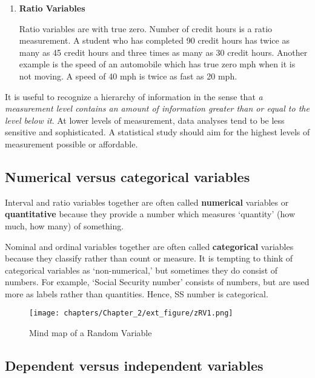 \documentclass[11pt]{book}\usepackage[]{graphicx}\usepackage[]{color}
\begin{document}
\begin{enumerate}
\item \textbf{Ratio Variables}

Ratio variables are  with true zero.  Number of credit hours is a ratio measurement.  A student who has completed 90 credit hours has twice as many as 45 credit hours and three times as many as 30 credit hours.  Another example is the speed of an automobile which has true zero mph when it is not moving.  A speed of 40 mph is twice as fast as 20 mph.
\end{enumerate}

It is useful to recognize a hierarchy of information in the sense that \textit{a measurement level contains an amount of information greater than or equal to the level below it}.  At lower levels of measurement, data analyses tend to be less sensitive and sophisticated.  A statistical study should aim for the highest levels of measurement possible or affordable.

\subsection{Numerical versus categorical variables}

Interval and ratio variables together are often called \textbf{numerical} variables or \textbf{quantitative} because they provide a number which measures `quantity' (how much, how many) of something.

Nominal and ordinal variables together are often called \textbf{categorical} variables because they classify rather than count or measure.  It is tempting to think of categorical variables as `non-numerical,' but sometimes they do consist of numbers.  For example, `Social Security number' consists of numbers, but are used more as labels rather than quantities.  Hence, SS number is categorical.

\begin{figure}[htbp]
   \centering

   \caption{Mind map of a Random Variable}

   \texttt{[image: chapters/Chapter\_2/ext\_figure/zRV1.png]} %

\end{figure}


\subsection{Dependent versus independent variables}
\end{document}
